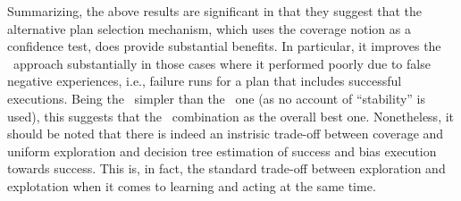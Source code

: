 Summarizing, the above results are significant in that they suggest that the
alternative plan selection mechanism, which uses the coverage notion as a
confidence test, does provide substantial benefits. In particular, it improves
the \CL\ approach substantially in those cases where it performed poorly due to
false negative experiences, i.e., failure runs for a plan that includes
successful executions.  Being the \CL\  simpler than the \BUL\ one (as no account
of ``stability'' is used), this suggests that the \CLSELB\ combination as the
overall best one.
Nonetheless, it should be noted that there is indeed an instrisic trade-off
between coverage and uniform exploration and decision tree estimation of success
and bias execution towards success. This is, in fact, the standard trade-off
between exploration and explotation when it comes to learning and acting at the
same time.





% 


